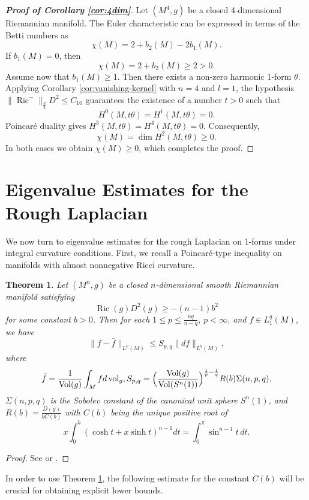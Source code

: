 \documentclass[12pt, twoside]{article}
\newtheorem{theorem}{Theorem}[section]
\theoremstyle{definition}
\numberwithin{equation}{section}
\begin{document}
\begin{proof}[\textbf{Proof of Corollary \ref{cor:4dim}}]
	Let \((M^4,g)\) be a closed 4‑dimensional Riemannian manifold. 
	The Euler characteristic can be expressed in terms of the Betti numbers as
	\[
	\chi(M) = 2 + b_2(M) - 2b_1(M).
	\]
If \(b_1(M)=0\), then \[\chi(M)=2+b_2(M)\ge 2>0.\]
Assume now that \(b_1(M)\ge 1\). Then there exists a non‑zero harmonic 1‑form \(\theta\).
	Applying Corollary \ref{cor:vanishing-kernel} with \(n=4\) and \(l=1\), 
	the hypothesis \(\|\operatorname{Ric}^{-}\|_{\frac{q}{2}}D^{2}\le C_{10}\) guarantees the existence of a number \(t>0\) such that
	\[
	H^{0}(M,t\theta)=H^{1}(M,t\theta)=0.
	\]
	Poincaré duality gives \(H^{3}(M,t\theta)=H^{4}(M,t\theta)=0\). Consequently,
	\[
	\chi(M)=\dim H^{2}(M,t\theta)\ge 0.
	\]
In both cases we obtain \(\chi(M)\ge 0\), which completes the proof.
\end{proof}


	\section{Eigenvalue Estimates for the Rough Laplacian}
	We now turn to eigenvalue estimates for the rough Laplacian on 1-forms under integral curvature conditions. First, we recall a Poincar\'e-type inequality on manifolds with almost nonnegative Ricci curvature.
	\begin{theorem}\label{thm:poincare-almost-nonnegative}
		Let \((M^{n},g)\) be a closed \(n\)-dimensional smooth Riemannian manifold satisfying
		\[
		\operatorname{Ric}(g) D^2(g) \ge -(n-1)b^2
		\]
		for some constant \(b > 0\). Then for each \(1 \le p \le \frac{nq}{n-q}\), \(p < \infty\), and \(f \in L^q_1(M)\), we have
		\[
		\|f - \bar{f} \|_{L^p(M)} 
		\le S_{p,q} \|df\|_{L^q(M)}, \label{eq:poincare-ineq} 
		\]
		where
		$$
		\bar{f}=\frac{1}{\operatorname{Vol}(g)} \int_M f d \operatorname{vol}_g,
		S_{p,q} = \Bigl(\frac{\operatorname{Vol}(g)}{\operatorname{Vol}(S^n(1))}\Bigr)^{\frac{1}{p}-\frac{1}{q}} 
		R(b) \Sigma(n,p,q),
		$$
		\(\Sigma(n,p,q)\) is the Sobolev constant of the canonical unit sphere \(S^n(1)\), and \(R(b) = \frac{D(g)}{b C(b)}\) with \(C(b)\) being the unique positive root of
		\begin{equation}\label{eq:Cb-equation}
		x \int_0^b (\cosh t + x \sinh t)^{n-1} dt = \int_0^\pi \sin^{n-1} t \, dt.
		\end{equation}
	\end{theorem}
	
	\begin{proof}
		See \cite[Theorem 5.1]{Chen2020} or \cite[Page 397]{Berard1988}.
	\end{proof}
	In order to use Theorem \ref{thm:poincare-almost-nonnegative}, the following estimate for the constant \(C(b)\) will be crucial for obtaining explicit lower bounds.
	
\end{document}
